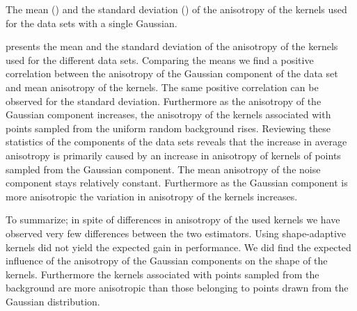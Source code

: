 	\begin{table}
		\centering
		
		\caption{The mean (\mean) and the standard deviation (\SD) of the anisotropy of the kernels used for the data sets with a single Gaussian.}
		\label{tab:results:singleSphere:anisotropy}
	\end{table}
	 presents the mean and the standard deviation of the anisotropy of the kernels used for the different data sets. Comparing the means we find a positive correlation between the anisotropy of the Gaussian component of the data set and mean anisotropy of the kernels. The same positive correlation can be observed for the standard deviation. Furthermore as the anisotropy of the Gaussian component increases, the anisotropy of the kernels associated with points sampled from the uniform random background rises.
	Reviewing these statistics of the components of the data sets reveals that the increase in average anisotropy is primarily caused by an increase in anisotropy of kernels of points sampled from the Gaussian component. The mean anisotropy of the noise component stays relatively constant. Furthermore as the Gaussian component is more anisotropic the variation in anisotropy of the kernels increases.

To summarize; in spite of differences in anisotropy of the used kernels we have observed very few differences between the two estimators. Using shape-adaptive kernels did not yield the expected gain in performance. We did find the expected influence of the anisotropy of the Gaussian components on the shape of the kernels. Furthermore the kernels associated with points sampled from the background are more anisotropic than those belonging to points drawn from the Gaussian distribution. 

